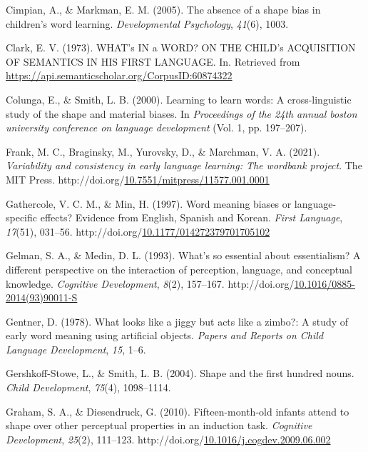 \documentclass[10pt, letterpaper]{article}
\newenvironment{CSLReferences}%
  {}%
  {\par}
\begin{document}
\begin{CSLReferences}{1}{0}
\leavevmode{}%
Cimpian, A., \& Markman, E. M. (2005). The absence of a shape bias in
children's word learning. \emph{Developmental Psychology}, \emph{41}(6),
1003.

\leavevmode{}%
Clark, E. V. (1973). WHAT's IN a WORD? ON THE CHILD's ACQUISITION OF
SEMANTICS IN HIS FIRST LANGUAGE. In. Retrieved from
\url{https://api.semanticscholar.org/CorpusID:60874322}

\leavevmode{}%
Colunga, E., \& Smith, L. B. (2000). Learning to learn words: A
cross-linguistic study of the shape and material biases. In
\emph{Proceedings of the 24th annual boston university conference on
language development} (Vol. 1, pp. 197--207).

\leavevmode{}%
Frank, M. C., Braginsky, M., Yurovsky, D., \& Marchman, V. A. (2021).
\emph{Variability and consistency in early language learning: The
wordbank project}. The MIT Press.
http://doi.org/\href{https://doi.org/10.7551/mitpress/11577.001.0001}{10.7551/mitpress/11577.001.0001}

\leavevmode{}%
Gathercole, V. C. M., \& Min, H. (1997). Word meaning biases or
language-specific effects? {Evidence} from {English}, {Spanish} and
{Korean}. \emph{First Language}, \emph{17}(51), 031--56.
http://doi.org/\href{https://doi.org/10.1177/014272379701705102}{10.1177/014272379701705102}

\leavevmode{}%
Gelman, S. A., \& Medin, D. L. (1993). What's so essential about
essentialism? A different perspective on the interaction of perception,
language, and conceptual knowledge. \emph{Cognitive Development},
\emph{8}(2), 157--167.
http://doi.org/\href{https://doi.org/10.1016/0885-2014(93)90011-S}{10.1016/0885-2014(93)90011-S}

\leavevmode{}%
Gentner, D. (1978). What looks like a jiggy but acts like a zimbo?: A
study of early word meaning using artificial objects. \emph{Papers and
Reports on Child Language Development}, \emph{15}, 1--6.

\leavevmode{}%
Gershkoff-Stowe, L., \& Smith, L. B. (2004). Shape and the first hundred
nouns. \emph{Child Development}, \emph{75}(4), 1098--1114.

\leavevmode{}%
Graham, S. A., \& Diesendruck, G. (2010). Fifteen-month-old infants
attend to shape over other perceptual properties in an induction task.
\emph{Cognitive Development}, \emph{25}(2), 111--123.
http://doi.org/\href{https://doi.org/10.1016/j.cogdev.2009.06.002}{10.1016/j.cogdev.2009.06.002}


\end{CSLReferences}
\end{document}
